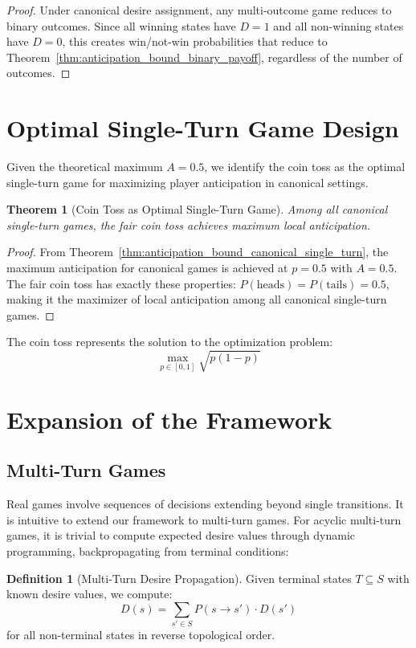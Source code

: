 \documentclass[manuscript,review,anonymous]{acmart}
\theoremstyle{definition}
\newtheorem{definition}{Definition}
\theoremstyle{plain}
\newtheorem{theorem}{Theorem}
\begin{document}
\begin{proof}
  Under canonical desire assignment, any multi-outcome game reduces to binary outcomes.
  Since all winning states have $D = 1$ and all non-winning states have $D = 0$, this creates win/not-win probabilities that reduce to Theorem~\ref{thm:anticipation_bound_binary_payoff}, regardless of the number of outcomes.
\end{proof}

\section{Optimal Single-Turn Game Design}
Given the theoretical maximum $A = 0.5$, we identify the coin toss as the optimal single-turn game for maximizing player anticipation in canonical settings.

\begin{theorem}[Coin Toss as Optimal Single-Turn Game]
  Among all canonical single-turn games, the fair coin toss achieves maximum local anticipation.
\end{theorem}

\begin{proof}
  From Theorem~\ref{thm:anticipation_bound_canonical_single_turn}, the maximum anticipation for canonical games is achieved at $p = 0.5$ with $A = 0.5$.
  The fair coin toss has exactly these properties: $P(\text{heads}) = P(\text{tails}) = 0.5$, making it the maximizer of local anticipation among all canonical single-turn games.
\end{proof}

The coin toss represents the solution to the optimization problem:
$$\max_{p \in [0,1]} \sqrt{p(1-p)}$$

\section{Expansion of the Framework}
\subsection{Multi-Turn Games}
Real games involve sequences of decisions extending beyond single transitions.
It is intuitive to extend our framework to multi-turn games.
For acyclic multi-turn games, it is trivial to compute expected desire values through dynamic programming, backpropagating from terminal conditions:

\begin{definition}[Multi-Turn Desire Propagation]
  Given terminal states $T \subseteq S$ with known desire values, we compute:
  \begin{equation}
    D(s) = \sum_{s' \in S} P(s \to s') \cdot D(s')
  \end{equation}
  for all non-terminal states in reverse topological order.
\end{definition}
\end{document}
